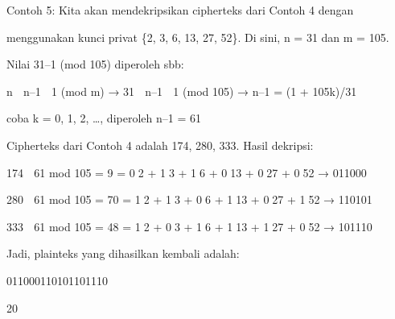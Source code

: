 \documentclass{article}
\begin{document}

Contoh 5:  Kita akan mendekripsikan cipherteks dari Contoh 4 dengan 

menggunakan kunci privat   \{2, 3, 6, 13, 27, 52\}. Di sini, n = 31 dan m = 105. 

Nilai 31–1 (mod 105) diperoleh sbb:

  n  n–1  1 (mod m) → 31  n–1  1 (mod 105) → n–1 = (1 + 105k)/31 

    coba k = 0, 1, 2, …, diperoleh n–1 = 61

Cipherteks dari Contoh 4 adalah 174, 280, 333. Hasil dekripsi:

 174  61 mod 105 = 9 = 02 + 13 + 16 + 013 + 027 + 052    → 011000

 280  61 mod 105 = 70 = 12 + 13 + 06 + 113 + 027 + 152 → 110101

 333  61 mod 105 = 48 = 12 + 03 + 16 + 113 + 127 + 052 → 101110

Jadi, plainteks yang dihasilkan kembali adalah: 


 011000110101101110

20
\end{document}
